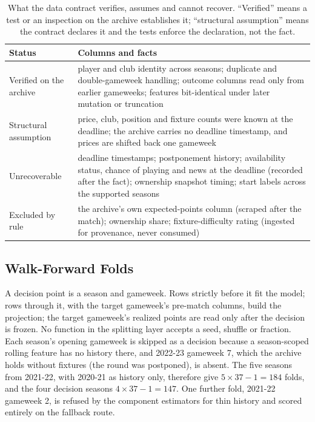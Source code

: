 \documentclass[11pt,a4paper]{article}
\begin{document}
\begin{table}[!htb]
\centering\small
\caption{What the data contract verifies, assumes and cannot recover. ``Verified'' means a test or an inspection on the archive establishes it; ``structural assumption'' means the contract declares it and the tests enforce the declaration, not the fact.}
\label{tab:timeclass}
\begin{tabularx}{\linewidth}{L L}
\toprule
Status & Columns and facts \\
\midrule
Verified on the archive & player and club identity across seasons; duplicate and double-gameweek handling; outcome columns read only from earlier gameweeks; features bit-identical under later mutation or truncation \\
Structural assumption & price, club, position and fixture counts were known at the deadline; the archive carries no deadline timestamp, and prices are shifted back one gameweek \\
Unrecoverable & deadline timestamps; postponement history; availability status, chance of playing and news at the deadline (recorded after the fact); ownership snapshot timing; start labels across the supported seasons \\
Excluded by rule & the archive's own expected-points column (scraped after the match); ownership share; fixture-difficulty rating (ingested for provenance, never consumed) \\
\bottomrule
\end{tabularx}
\end{table}

\subsection{Walk-Forward Folds}

A decision point is a season and gameweek. Rows strictly before it fit the model; rows through it, with the target gameweek's pre-match columns, build the projection; the target gameweek's realized points are read only after the decision is frozen. No function in the splitting layer accepts a seed, shuffle or fraction. Each season's opening gameweek is skipped as a decision because a season-scoped rolling feature has no history there, and 2022-23 gameweek 7, which the archive holds without fixtures (the round was postponed), is absent. The five seasons from 2021-22, with 2020-21 as history only, therefore give $5\times 37 - 1 = 184$ folds, and the four decision seasons $4\times 37 - 1 = 147$. One further fold, 2021-22 gameweek 2, is refused by the component estimators for thin history and scored entirely on the fallback route.
\end{document}
